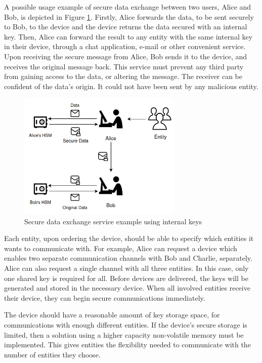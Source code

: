 A possible usage example of secure data exchange between two users, Alice and Bob, is depicted in Figure \ref{fig:user:data-service}. Firstly, Alice forwards the data, to be sent securely to Bob, to the device and the device returns the data secured with an internal key. Then, Alice can forward the result to any entity with the same internal key in their device, through a chat application, e-mail or other convenient service.
Upon receiving the secure message from Alice, Bob sends it to the device, and receives the original message back.
This service must prevent any third party from gaining access to the data, or altering the message. The receiver can be confident of the data's origin. It could not have been sent by any malicious entity.

\begin{figure}[h!]
    \centering
    \includegraphics[width=0.7\textwidth]{./Images/user-data-service.png}
    \caption{Secure data exchange service example using internal keys}
    \label{fig:user:data-service}
\end{figure}

Each entity, upon ordering the device, should be able to specify which entities it wants to communicate with.
For example, Alice can request a device which enables two separate communication channels with Bob and Charlie, separately. Alice can also request a single channel with all three entities. In this case, only one shared key is required for all.
Before devices are delivered, the keys will be generated and stored in the necessary device. When all involved entities receive their device, they can begin secure communications immediately.

The device should have a reasonable amount of key storage space, for communications with enough different entities.
If the device's secure storage is limited, then a solution using a higher capacity non-volatile memory must be implemented.
This gives entities the flexibility needed to communicate with the number of entities they choose.

